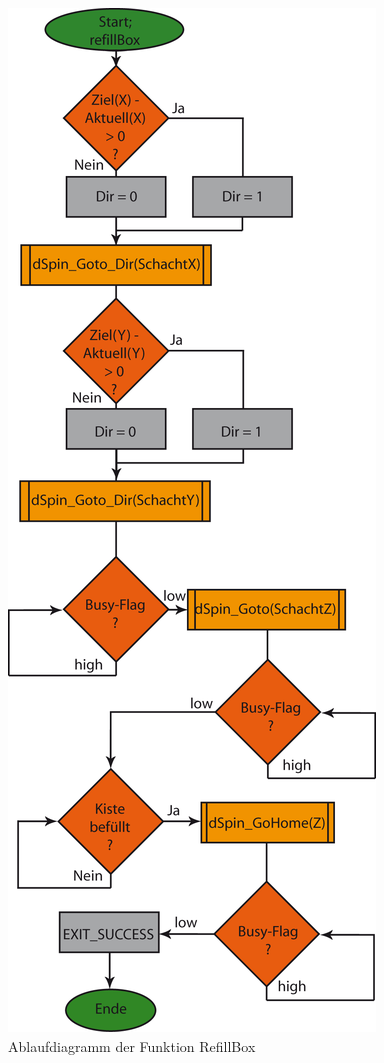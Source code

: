 \begin{figure}[h]
\includegraphics[scale = 0.8]{./RefillBox.png}
\hspace{-14pt}
\caption{Ablaufdiagramm der Funktion RefillBox}
\end{figure} 





